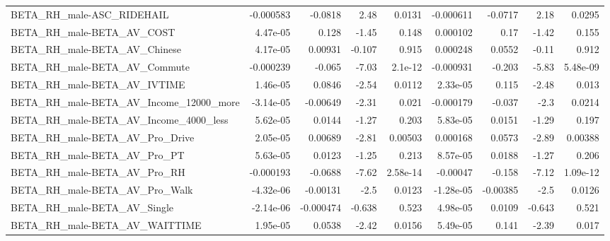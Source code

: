 \begin{tabular}{lrrrrrrrr}
BETA\_RH\_male-ASC\_RIDEHAIL                          &   -0.000583 &      -0.0818 &      2.48 &   0.0131 &  -0.000611 &     -0.0717 &         2.18 &        0.0295 \\
BETA\_RH\_male-BETA\_AV\_COST                          &    4.47e-05 &        0.128 &     -1.45 &    0.148 &   0.000102 &        0.17 &        -1.42 &         0.155 \\
BETA\_RH\_male-BETA\_AV\_Chinese                       &    4.17e-05 &      0.00931 &    -0.107 &    0.915 &   0.000248 &      0.0552 &        -0.11 &         0.912 \\
BETA\_RH\_male-BETA\_AV\_Commute                       &   -0.000239 &       -0.065 &     -7.03 &  2.1e-12 &  -0.000931 &      -0.203 &        -5.83 &      5.48e-09 \\
BETA\_RH\_male-BETA\_AV\_IVTIME                        &    1.46e-05 &       0.0846 &     -2.54 &   0.0112 &   2.33e-05 &       0.115 &        -2.48 &         0.013 \\
BETA\_RH\_male-BETA\_AV\_Income\_12000\_more             &   -3.14e-05 &     -0.00649 &     -2.31 &    0.021 &  -0.000179 &      -0.037 &         -2.3 &        0.0214 \\
BETA\_RH\_male-BETA\_AV\_Income\_4000\_less              &    5.62e-05 &       0.0144 &     -1.27 &    0.203 &   5.83e-05 &      0.0151 &        -1.29 &         0.197 \\
BETA\_RH\_male-BETA\_AV\_Pro\_Drive                     &    2.05e-05 &      0.00689 &     -2.81 &  0.00503 &   0.000168 &      0.0573 &        -2.89 &       0.00388 \\
BETA\_RH\_male-BETA\_AV\_Pro\_PT                        &    5.63e-05 &       0.0123 &     -1.25 &    0.213 &   8.57e-05 &      0.0188 &        -1.27 &         0.206 \\
BETA\_RH\_male-BETA\_AV\_Pro\_RH                        &   -0.000193 &      -0.0688 &     -7.62 & 2.58e-14 &   -0.00047 &      -0.158 &        -7.12 &      1.09e-12 \\
BETA\_RH\_male-BETA\_AV\_Pro\_Walk                      &   -4.32e-06 &     -0.00131 &      -2.5 &   0.0123 &  -1.28e-05 &    -0.00385 &         -2.5 &        0.0126 \\
BETA\_RH\_male-BETA\_AV\_Single                        &   -2.14e-06 &    -0.000474 &    -0.638 &    0.523 &   4.98e-05 &      0.0109 &       -0.643 &         0.521 \\
BETA\_RH\_male-BETA\_AV\_WAITTIME                      &    1.95e-05 &       0.0538 &     -2.42 &   0.0156 &   5.49e-05 &       0.141 &        -2.39 &         0.017 \\

\end{tabular}
